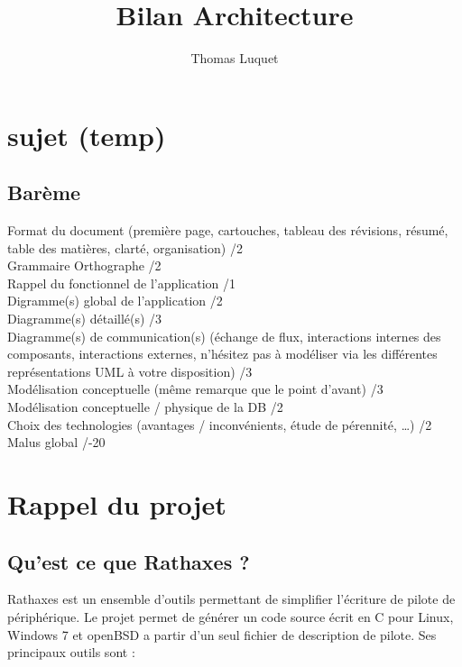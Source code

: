 \documentclass{rtxreport}
\author{Thomas Luquet}
\title{Bilan Architecture}
\begin{document}
\maketitle

\rtxmaketitleblock

\tableofcontents

\chapter{sujet (temp)}

\section{Barème}

Format du document (première page, cartouches, tableau des révisions, résumé,
table des matières, clarté, organisation) /2\\
Grammaire Orthographe /2\\
Rappel du fonctionnel de l'application /1\\
Digramme(s) global de l'application /2\\
Diagramme(s) détaillé(s) /3\\
Diagramme(s) de communication(s) (échange de flux, interactions internes des
composants, interactions externes, n'hésitez pas à modéliser via les différentes
représentations UML à votre disposition) /3\\
Modélisation conceptuelle (même remarque que le point d'avant) /3\\
Modélisation conceptuelle / physique de la DB /2\\
Choix des technologies (avantages / inconvénients, étude de pérennité, …) /2\\
Malus global /-20\\

\chapter{Rappel du projet}

\section{Qu'est ce que Rathaxes ?} 

Rathaxes est un ensemble d'outils permettant de simplifier l'écriture de pilote
de périphérique. Le projet permet de générer un code source écrit en C pour
Linux, Windows 7 et openBSD a partir d'un seul fichier de description de pilote.
Ses principaux outils sont :
\end{document}
